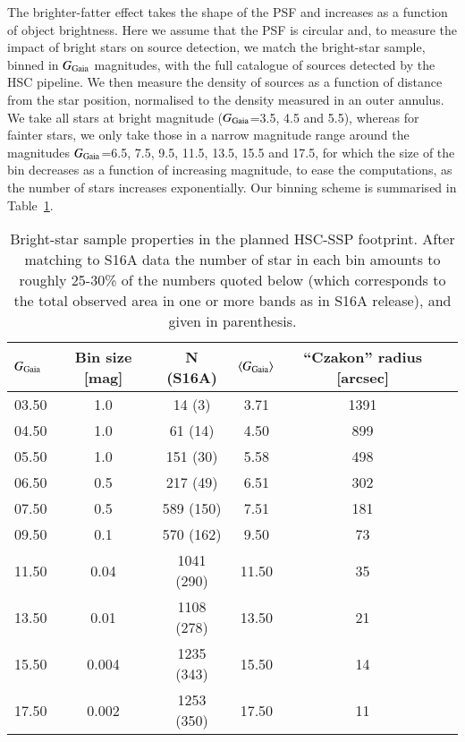 \documentclass[11pt,a4paper,oneside,final]{scrartcl}
\begin{document}
The brighter-fatter effect takes the shape of the PSF and increases as a function of object brightness. Here we assume that the PSF is circular and, to measure the impact of bright stars on source detection, we match the bright-star sample, binned in $G_{\rm Gaia}$ magnitudes, with the full catalogue of sources detected by the HSC pipeline. We then measure the density of sources as a function of distance from the star position, normalised to the density measured in an outer annulus. We take all stars at bright magnitude ($G_{\rm Gaia}$=3.5, 4.5 and 5.5), whereas for fainter stars, we only take those in a narrow magnitude range around the magnitudes $G_{\rm Gaia}$=6.5, 7.5, 9.5, 11.5, 13.5, 15.5 and 17.5, for which the size of the bin decreases as a function of increasing magnitude, to ease the computations, as the number of stars increases exponentially. Our binning scheme is summarised in Table~\ref{tab:binning}.
\begin{table}
\caption{Bright-star sample properties in the planned HSC-SSP footprint. After matching to S16A data the number of star in each bin amounts to roughly 25-30\% of the numbers quoted below (which corresponds to the total observed area in one or more bands as in S16A release), and given in parenthesis.}
\begin{center}
\begin{tabular}{ |l|c|c|c|c|c| }
\hline
 $G_{\rm Gaia}$  & Bin size [mag] & N (S16A) & $\langle G_{\rm Gaia} \rangle$ & ``Czakon'' radius [arcsec]  \\
\hline
03.50 & 1.0 & 14 (3) & 3.71 &  1391 \\ 
04.50 & 1.0 & 61 (14) & 4.50 &  899 \\ 
05.50 & 1.0 & 151 (30) & 5.58 &  498 \\ 
06.50 & 0.5 & 217 (49) & 6.51 &  302 \\ 
07.50 & 0.5 & 589 (150) & 7.51 &  181 \\ 
09.50 & 0.1 & 570 (162) & 9.50 &  73 \\ 
11.50 & 0.04 & 1041 (290) & 11.50 &  35 \\ 
13.50 & 0.01 & 1108 (278) & 13.50 &  21 \\ 
15.50 & 0.004 & 1235 (343) & 15.50 &  14 \\ 
17.50 & 0.002 & 1253 (350) & 17.50 &  11 \\ 
\hline
\end{tabular}
\end{center}
\label{tab:binning}
\end{table}
\end{document}
